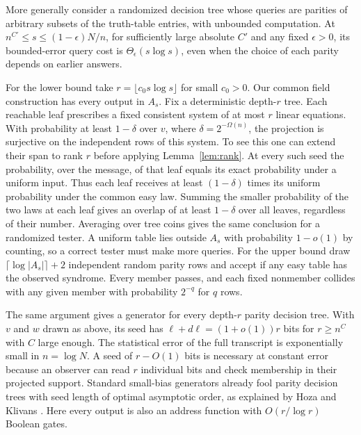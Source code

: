 \documentclass[11pt]{article}
\begin{document}
More generally consider a randomized decision tree whose queries are parities of arbitrary subsets of the truth-table entries, with unbounded computation. At $n^{C'}\le s\le(1-\epsilon)N/n$, for sufficiently large absolute $C'$ and any fixed $\epsilon>0$, its bounded-error query cost is $\Theta_\epsilon(s\log s)$, even when the choice of each parity depends on earlier answers.

For the lower bound take $r=\lfloor c_0s\log s\rfloor$ for small $c_0>0$. Our common field construction has every output in $A_s$. Fix a deterministic depth-$r$ tree. Each reachable leaf prescribes a fixed consistent system of at most $r$ linear equations. With probability at least $1-\delta$ over $v$, where $\delta=2^{-\Omega(n)}$, the projection is surjective on the independent rows of this system. To see this one can extend their span to rank $r$ before applying Lemma~\ref{lem:rank}. At every such seed the probability, over the message, of that leaf equals its exact probability under a uniform input. Thus each leaf receives at least $(1-\delta)$ times its uniform probability under the common easy law. Summing the smaller probability of the two laws at each leaf gives an overlap of at least $1-\delta$ over all leaves, regardless of their number. Averaging over tree coins gives the same conclusion for a randomized tester. A uniform table lies outside $A_s$ with probability $1-o(1)$ by counting, so a correct tester must make more queries. For the upper bound draw $\lceil\log |A_s|\rceil+2$ independent random parity rows and accept if any easy table has the observed syndrome. Every member passes, and each fixed nonmember collides with any given member with probability $2^{-q}$ for $q$ rows.

The same argument gives a generator for every depth-$r$ parity decision tree. With $v$ and $w$ drawn as above, its seed has $\ell+d\ell=(1+o(1))r$ bits for $r\ge n^C$ with $C$ large enough. The statistical error of the full transcript is exponentially small in $n=\log N$. A seed of $r-O(1)$ bits is necessary at constant error because an observer can read $r$ individual bits and check membership in their projected support. Standard small-bias generators already fool parity decision trees with seed length of optimal asymptotic order, as explained by Hoza and Klivans \cite[Section~1.5.4]{hk}. Here every output is also an address function with $O(r/\log r)$ Boolean gates.
\end{document}

